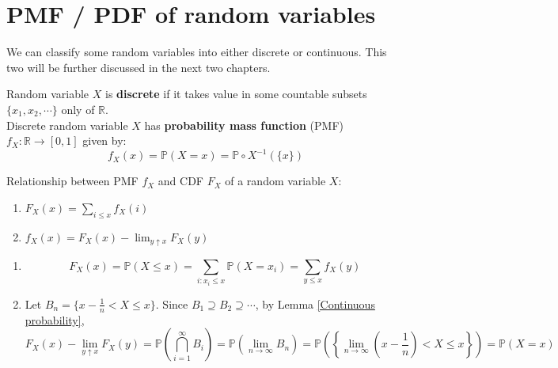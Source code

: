 \documentclass{huhtakm-template-book}
\newcommand{\prob}{\mathbb{P}}
\begin{document}
\section{PMF / PDF of random variables}
    We can classify some random variables into either discrete or continuous. This two will be further discussed in the next two chapters.
    \begin{defn}
        Random variable $X$ is \textbf{discrete} if it takes value in some countable subsets $\{x_{1},x_{2},\cdots\}$ only of $\mathbb{R}$.\\
        Discrete random variable $X$ has \textbf{probability mass function} (PMF) $f_{X}:\mathbb{R}\to [0,1]$ given by: 
        \begin{equation*}
            f_{X}(x)=\prob(X=x)=\prob\circ X^{-1}(\{x\})
        \end{equation*}
    \end{defn}
    \begin{lem}
        \label{Relationship between pmf and cdf}
        Relationship between PMF $f_{X}$ and CDF $F_{X}$ of a random variable $X$:
        \begin{enumerate}
            \item $F_{X}(x)=\sum_{i\leq x}f_{X}(i)$
            \item $f_{X}(x)=F_{X}(x)-\lim_{y\uparrow x}F_{X}(y)$
        \end{enumerate}
    \end{lem}
    \begin{proofing}
        \begin{enumerate}
            \item 
            \begin{equation*}
			    F_{X}(x)=\prob(X\leq x)=\sum_{i:x_{i}\leq x}\prob(X=x_{i})=\sum_{y\leq x}f_{X}(y)
            \end{equation*}
            \item Let $B_{n}=\{x-\frac{1}{n}<X\leq x\}$. Since $B_{1}\supseteq B_{2}\supseteq\cdots$, by Lemma \ref{Continuous probability},
            \begin{equation*}
                F_{X}(x)-\lim_{y\uparrow x}F_{X}(y)=\prob\left(\bigcap_{i=1}^{\infty}B_{i}\right)=\prob\left(\lim_{n\to\infty}B_{n}\right)=\prob\left(\left\{\lim_{n\to\infty}\left(x-\frac{1}{n}\right)<X\leq x\right\}\right)=\prob(X=x)
            \end{equation*}
        \end{enumerate}
    \end{proofing}
\end{document}
